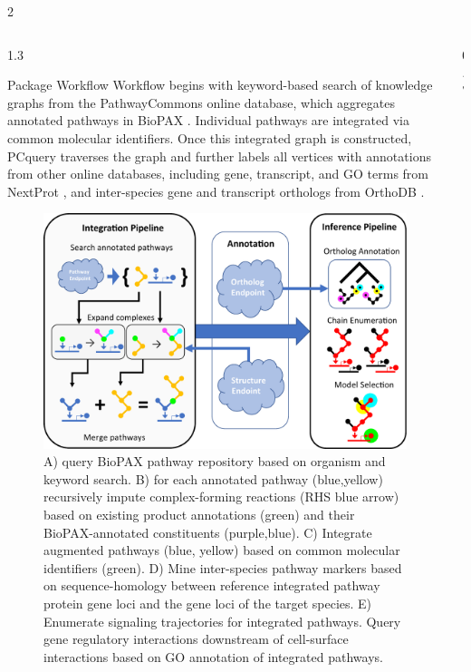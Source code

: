 \documentclass[final]{beamer}
\newlength{\colwidth}
\begin{document}
\begin{frame}[t,fragile]
\begin{columns}[t]
\begin{column}{2\colwidth}
\begin{columns}[t]
\begin{column}{1.3\colwidth}
\begin{block}{Package Workflow}
        Workflow begins with keyword-based search of knowledge graphs from the PathwayCommons \cite{rodchenkov2020pathway} online database, which aggregates annotated pathways in BioPAX \cite{demir2010biopax}.  Individual pathways are integrated via common molecular identifiers.   Once this integrated graph is constructed, PCquery traverses the graph and further labels all vertices with annotations from other online databases, including gene, transcript, and GO terms from NextProt \cite{lane2012nextprot}, and inter-species gene and transcript orthologs from OrthoDB \cite{kriventseva2019orthodb}.
        
        \begin{figure}
          \centering
          \includegraphics[scale=1.5]{Image/schematic.pdf}
          \caption{A) query BioPAX pathway repository based on organism and keyword search.  B) for each annotated pathway (blue,yellow) recursively impute complex-forming reactions (RHS blue arrow) based on existing product annotations (green) and their BioPAX-annotated constituents (purple,blue).  C) Integrate augmented pathways (blue, yellow) based  on common molecular identifiers (green).  D) Mine inter-species pathway markers based on sequence-homology between reference integrated pathway protein gene loci and the gene loci of the target species.  E) Enumerate signaling trajectories for integrated pathways.  Query gene regulatory interactions downstream of cell-surface interactions based on GO annotation of integrated pathways.}
        \end{figure}

      \end{block}
    \end{column}
    \begin{column}{0.7\colwidth}
    

\end{column}
\end{columns}
\end{column}
\end{columns}
\end{frame}
\end{document}
